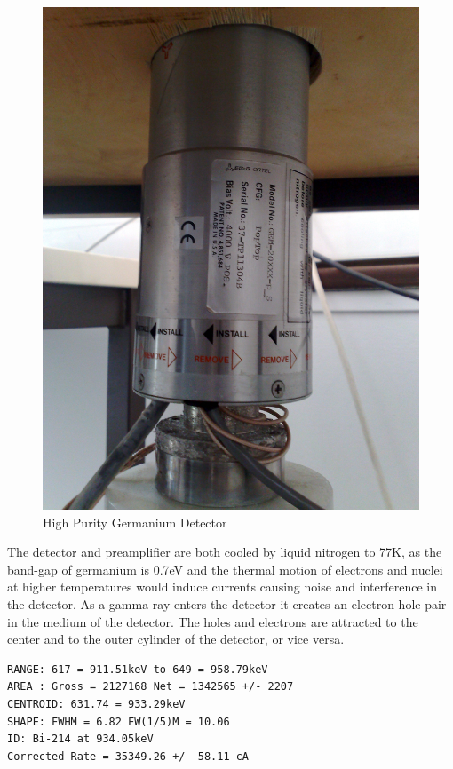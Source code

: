 \begin{figure}[htp]
  \begin{center}
    \includegraphics[scale=0.8]{chapters/activity_code/images/hpge.png}
    \caption{High Purity Germanium Detector}
    \label{fig:hpge}
  \end{center}
\end{figure}

The detector and preamplifier are both cooled by liquid nitrogen to 77K, as the band-gap of germanium is 0.7eV and the thermal motion of electrons and nuclei at higher temperatures would induce currents causing noise and interference in the detector.  As a gamma ray enters the detector it creates an electron-hole pair in the medium of the detector.  The holes and electrons are attracted to the center and to the outer cylinder of the detector, or vice versa.




\begin{lstlisting}[style=sMaestro,caption={Maestro 931keV Peak Measurement},captionpos=b]
RANGE: 617 = 911.51keV to 649 = 958.79keV
AREA : Gross = 2127168 Net = 1342565 +/- 2207
CENTROID: 631.74 = 933.29keV
SHAPE: FWHM = 6.82 FW(1/5)M = 10.06
ID: Bi-214 at 934.05keV
Corrected Rate = 35349.26 +/- 58.11 cA
\end{lstlisting}

